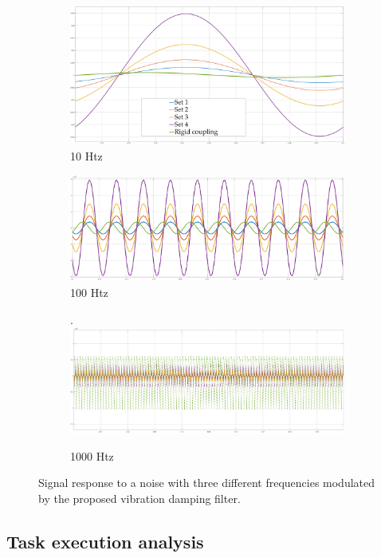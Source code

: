 \begin{figure}[h]
	\begin{subfigure}[h!]{1\linewidth}
		\centering
		\includegraphics[width=\textwidth, height=0.29\textwidth]{Images/vibr10Htz}
		\caption{10 Htz}
		\label{fig:10Htz}
	\end{subfigure}	
  \newline
	\begin{subfigure}[h!]{1\linewidth}
		\centering
		\includegraphics[width=\textwidth, height=0.29\textwidth]{Images/vibr100Htz}
		\caption{100 Htz}
		\label{fig:100Htz}
	\end{subfigure}	
  \newline
	\begin{subfigure}[h!]{1\linewidth}
		\centering.
		\includegraphics[width=\textwidth, height=0.29\textwidth]{Images/vibr1000Htz}
		\caption{1000 Htz}
		\label{fig:1000Htz}
	\end{subfigure}
\caption{ Signal response to a noise with three different frequencies modulated 
  by the proposed vibration damping filter.}
\end{figure}

\newpage

\subsection{Task execution analysis}

